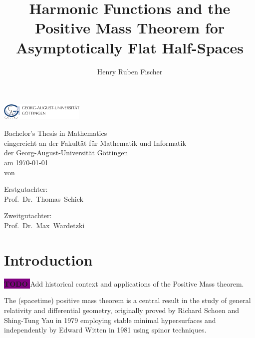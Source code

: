 \documentclass[titlepage,numbers=noenddot,headinclude,oneside,%
footinclude=true,cleardoublepage=empty,%
BCOR=5mm,paper=a4,fontsize=11pt,%
english,%
]{scrartcl}
\title{Harmonic Functions and the Positive Mass Theorem for Asymptotically Flat Half-Spaces}
\author{Henry Ruben Fischer}
\newcommand{\todomark}{%
    \colorbox{purple}{%
        \textnormal\ttfamily\bfseries\color{white}%
        TODO%
    }%
}
\newcommand{\todo}[1][]{%
    \ifstrempty{#1}{%
        \def\todotext{Todo}%
    }{%
        \def\todotext{Todo: #1}%
    }%
    \todomark%
    {%
        \marginpar{%
            \raggedright\normalfont\sffamily\scriptsize\todotext%
        }%
    }%
}
\begin{document}
\theoremstyle{plain}
\makeatletter
\begin{titlepage}
\begin{center}

\textsc{\LARGE \@title}

\vspace{2cm}

\includegraphics[width=0.3\textwidth]{Logo.pdf}

\vspace{1.5cm}

\Large Bachelor's Thesis in Mathematics \\
\Large eingereicht an der Fakultät für Mathematik und Informatik\\
\Large der Georg-August-Universität Göttingen\\
am \today\\

\vspace{1cm}
\small{von}\\

\large{\@author}
\vspace{1cm}

\small{Erstgutachter:}\\

\large{Prof.~Dr.~Thomas~Schick}

\vspace{1cm}

\small{Zweitgutachter:}\\

\large{Prof.~Dr.~Max~Wardetzki}

\end{center}
\end{titlepage}
\makeatother

\tableofcontents
\newpage
{}
\section{Introduction}

\todo{Add historical context and applications of the Positive Mass theorem.}

The (spacetime) positive mass theorem is a central result in the study of general relativity and differential geometry, originally proved by Richard Schoen and Shing-Tung Yau in 1979 \parencite{schoenProofPositiveMass1979} employing stable minimal hypersurfaces and independently by Edward Witten in 1981 \parencite{wittenNewProofPositive1981} using spinor techniques.
\end{document}
